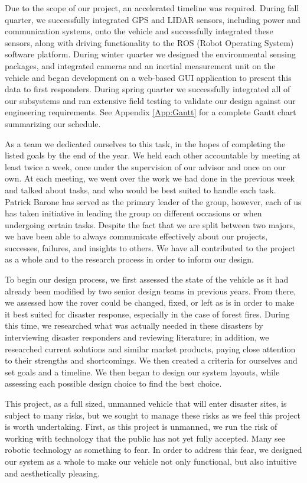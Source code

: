 Due to the scope of our project, an accelerated timeline was required. During fall quarter, we successfully integrated GPS and LIDAR sensors, including power and communication systems, onto the vehicle and successfully integrated these sensors, along with driving functionality to the ROS (Robot Operating System) software platform. During winter quarter we designed the environmental sensing packages, and integrated cameras and an inertial measurement unit on the vehicle and began development on a web-based GUI application to present this data to first responders. During spring quarter we successfully integrated all of our subsystems and ran extensive field testing to validate our design against our engineering requirements. See Appendix \ref{App:Gantt} for a complete Gantt chart summarizing our schedule. 

As a team we dedicated ourselves to this task, in the hopes of completing the listed goals by the end of the year. We held each other accountable by meeting at least twice a week, once under the supervision of our advisor and once on our own. At each meeting, we went over the work we had done in the previous week and talked about tasks, and who would be best suited to handle each task. Patrick Barone has served as the primary leader of the group, however, each of us has taken initiative in leading the group on different occasions or when undergoing certain tasks. Despite the fact that we are split between two majors, we have been able to always communicate effectively about our projects, successes, failures, and insights to others. We have all contributed to the project as a whole and to the research process in order to inform our design. 

To begin our design process, we first assessed the state of the vehicle as it had already been modified by two senior design teams in previous years. From there, we assessed how the rover could be changed, fixed, or left as is in order to make it best suited for disaster response, especially in the case of forest fires. During this time, we researched what was actually needed in these disasters by interviewing disaster responders and reviewing literature; in addition, we researched current solutions and similar market products, paying close attention to their strengths and shortcomings. We then created a criteria for ourselves and set goals and a timeline. We then began to design our system layouts, while assessing each possible design choice to find the best choice. 

This project, as a full sized, unmanned vehicle that will enter disaster sites, is subject to many risks, but we sought to manage these risks as we feel this project is worth undertaking. First, as this project is unmanned, we run the risk of working with technology that the public has not yet fully accepted. Many see robotic technology as something to fear. In order to address this fear, we designed our system as a whole to make our vehicle not only functional, but also  intuitive and aesthetically pleasing.

